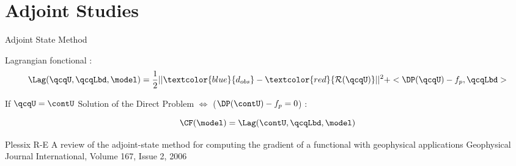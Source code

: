 \section{Adjoint Studies}
\renewcommand\tikzscale{1.3}



\begin{frame}{Adjoint State Method}

Lagrangian fonctional \cite{plessix} :
  \begin{equation}
    \Lag(\qcqU,\qcqLbd,\model) = \frac{1}{2}||\textcolor{blue}{d_{obs}}-\textcolor{red}{\mathcal{R}(\qcqU)}||^2 + <\DP(\qcqU)-f_p,\qcqLbd>
  \end{equation}

    If $\qcqU=\contU$ Solution of the Direct Problem $\Longleftrightarrow$ ($\DP(\contU)-f_p = 0$) :

  \begin{equation}
    \CF(\model) = \Lag(\contU,\qcqLbd,\model)
  \end{equation}



  \vfill
  \tiny
  \begin{thebibliography}{1}
   Plessix R-E
    \newblock A review of the adjoint-state method for computing the gradient
of a functional with geophysical applications
    \newblock Geophysical Journal International, Volume 167, Issue 2, 2006
  \end{thebibliography}

\end{frame}











